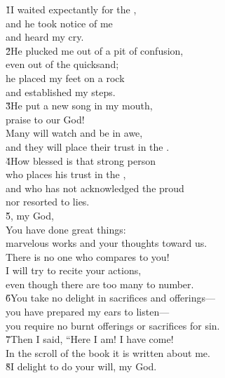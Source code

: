 \begin{poetry}
\poeml \v{1}I waited expectantly for the , \\
\poemll    and he took notice of me \\
\poemlll       and heard my cry. \\
\poeml \v{2}He plucked me out of a pit of confusion, \\
\poemll    even out of the quicksand; \\
\poeml he placed my feet on a rock \\
\poemll    and established my steps. \\
\poeml \v{3}He put a new song in my mouth, \\
\poemll    praise to our God! \\
\poeml Many will watch and be in awe, \\
\poemll    and they will place their trust in the . \\
\poeml \v{4}How blessed is that strong person \\
\poemll    who places his trust in the , \\
\poemll    and who has not acknowledged the proud \\
\poemlll       nor resorted to lies. \\
\poeml \v{5}, my God, \\
\poemll    You have done great things: \\
\poemlll       marvelous works and your thoughts toward us. \\
\poeml There is no one who compares to you! \\
\poemll    I will try to recite your actions, \\
\poemlll       even though there are too many to number. \\
\poeml \v{6}You take no delight in sacrifices and offerings--- \\
\poemll    you have prepared my ears to listen--- \\
\poemlll       you require no burnt offerings or sacrifices for sin. \\
\poeml \v{7}Then I said, ``Here I am! I have come! \\
\poemll    In the scroll of the book it is written about me. \\
\poeml \v{8}I delight to do your will, my God. \\

\end{poetry}
